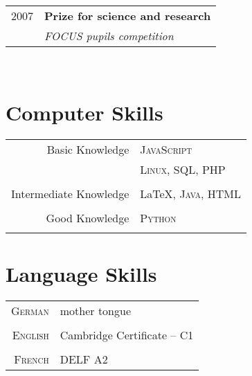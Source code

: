 \documentclass[a4paper,10pt]{article} %
\begin{document}
{\begin{minipage}[t]{0.44\textwidth}
\begin{tabular}{rl}
2007	 & \textbf{Prize for science and research}\\
& \textit{FOCUS pupils competition}
\end{tabular}\\[10pt]


\section{Computer Skills}

\begin{tabular}{rl}
Basic Knowledge         & \textsc{JavaScript}\\
                        & \textsc{Linux}, \textsc{SQL}, \textsc{PHP}\\ \\
Intermediate Knowledge  & \LaTeX, \textsc{Java}, \textsc{HTML}\\ \\
Good Knowledge          & \textsc{Python}\\ \\
\end{tabular}


\section{Language Skills}

\begin{tabular}{rl}
\textsc{German}
& mother tongue\\
& \\
\textsc{English}
& Cambridge Certificate – C1\\
& \\
\textsc{French}
& DELF A2 \\
\end{tabular}\\[10pt]


\end{minipage} %

}
\end{document}
